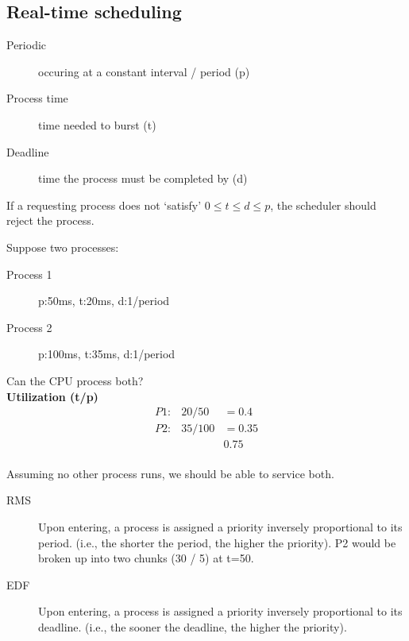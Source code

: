 \documentclass[a4paper]{article}
\begin{document}
\newpage

\begin{multicols*}{2}
    \subsection*{Real-time scheduling}
    \begin{description}
        \item[Periodic] occuring at a constant interval / period (p)
        \item[Process time] time needed to burst (t)
        \item[Deadline] time the process must be completed by (d)
    \end{description}

    If a requesting process does not `satisfy' \(0 \leq t \leq d \leq p\), the
    scheduler should reject the process.

    Suppose two processes:
    \begin{description}
        \item[Process 1]  p:50ms, t:20ms, d:1/period
        \item[Process 2]  p:100ms, t:35ms, d:1/period
    \end{description}
    \begin{multicols*}{3}
        Can the CPU process both?
        \columnbreak \\
        \textbf{Utilization (t/p)}
        \begin{align*}
            P1: & 20/50  & = 0.4  \\
            P2: & 35/100 & = 0.35 \\
                &        & 0.75
        \end{align*}
        \columnbreak \\
        Assuming no other process runs, we should be able to service both.
    \end{multicols*}

    \begin{description}
        \item[RMS] Upon entering, a process is assigned a priority inversely
            proportional to its period. (i.e., the shorter the period, the
            higher the priority). P2 would be broken up into two chunks (30 / 5)
            at t=50.
        \item[EDF] Upon entering, a process is assigned a priority inversely
            proportional to its deadline. (i.e., the sooner the deadline, the higher
            the priority).
    \end{description}


\end{multicols*}
\end{document}
